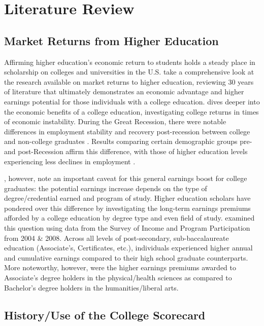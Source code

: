 \documentclass[a4paper, 12pt]{article}
\begin{document}
\section*{Literature Review}

\subsection*{Market Returns from Higher Education}

Affirming higher education's economic return to
students holds a steady place in scholarship on colleges and
universities in the U.S. \textcite{Oreopoulous_Petronijevic_2013} take
a comprehensive look at the research available on market returns to
higher education, reviewing 30 years of literature that ultimately
demonstrates an economic advantage and higher earnings potential for
those individuals with a college education. \textcite{hout_2012} dives
deeper into the economic benefits of a college education,
investigating college returns in times of economic instability. During
the Great Recession, there were notable differences in employment
stability and recovery post-recession between college and non-college
graduates \parencite{hout_2012, hout_etal_2011ch}. Results comparing
certain demographic groups pre- and post-Recession affirm this
difference, with those of higher education levels experiencing less
declines in employment \parencite{hoynesetal_2012}.


\textcite{Carnevale_etal_2011}, however, note an important caveat for
this general earnings boost for college graduates: the potential
earnings increase depends on the type of degree/credential earned and
program of study. Higher education scholars have pondered over this
difference by investigating the long-term earnings premiums afforded
by a college education by degree type and even field of
study. \textcite{kimtamborini_2019} examined this question using data
from the Survey of Income and Program Participation from 2004 \&
2008. Across all levels of post-secondary, sub-baccalaureate education
(Associate's, Certificates, etc.), individuals experienced higher
annual and cumulative earnings compared to their high school graduate
counterparts. More noteworthy, however, were the higher earnings
premiums awarded to Associate's degree holders in the physical/health
sciences as compared to Bachelor's degree holders in the
humanities/liberal arts.

\subsection*{History/Use of the College Scorecard}
\end{document}
